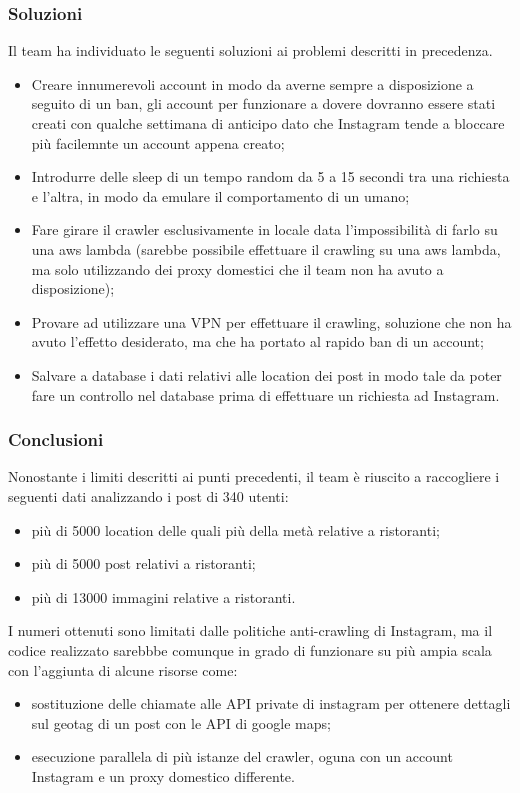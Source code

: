 \subsubsection{Soluzioni}
Il team ha individuato le seguenti soluzioni ai problemi descritti in precedenza.
\begin{itemize}
    \item Creare innumerevoli account in modo da averne sempre a disposizione a seguito di un ban, gli account per funzionare a dovere dovranno essere stati creati con qualche settimana di anticipo dato che Instagram tende a bloccare più facilemnte un account appena creato;
    \item Introdurre delle sleep di un tempo random da 5 a 15 secondi tra una richiesta e l'altra, in modo da emulare il comportamento di un umano;
    \item Fare girare il crawler esclusivamente in locale data l'impossibilità di farlo su una aws lambda (sarebbe possibile effettuare il crawling su una aws lambda, ma solo utilizzando dei proxy domestici che il team non ha avuto a disposizione);
    \item Provare ad utilizzare una VPN per effettuare il crawling, soluzione che non ha avuto l'effetto desiderato, ma che ha portato al rapido ban di un account;
    \item Salvare a database i dati relativi alle location dei post in modo tale da poter fare un controllo nel database prima di effettuare un richiesta ad Instagram.
\end{itemize}

\subsubsection{Conclusioni}
Nonostante i limiti descritti ai punti precedenti, il team è riuscito a raccogliere i seguenti dati analizzando i post di 340 utenti:
\begin{itemize}
    \item più di 5000 location delle quali più della metà relative a ristoranti;
    \item più di 5000 post relativi a ristoranti;
    \item più di 13000 immagini relative a ristoranti.
\end{itemize}
I numeri ottenuti sono limitati dalle politiche anti-crawling di Instagram, ma il codice realizzato sarebbbe comunque in grado di funzionare su più ampia scala con l'aggiunta di alcune risorse come:
\begin{itemize}
    \item sostituzione delle chiamate alle API private di instagram per ottenere dettagli sul geotag di un post con le API di google maps;
    \item esecuzione parallela di più istanze del crawler, oguna con un account Instagram e un proxy domestico differente.
\end{itemize}

